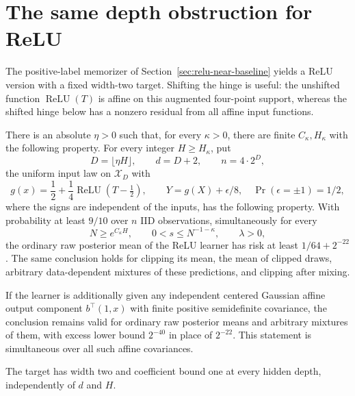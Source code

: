 \section{The same depth obstruction for ReLU}
\label{sec:relu-depth-extension}
The positive-label memorizer of Section~\ref{sec:relu-near-baseline} yields a ReLU version with a fixed width-two target. Shifting the hinge is useful: the unshifted function $\operatorname{ReLU}(T)$ is affine on this augmented four-point support, whereas the shifted hinge below has a nonzero residual from all affine input functions.

\begin{theorem}
\label{thm:relu-depth-lower}
There is an absolute $\eta>0$ such that, for every $\kappa>0$, there are finite $C_\kappa,H_\kappa$ with the following property. For every integer $H\ge H_\kappa$, put
\[
 D=\lfloor\eta H\rfloor,\qquad d=D+2,\qquad n=4\cdot2^D,
\]
the uniform input law on $\mathcal X_D$ with
\[
 g(x)=\frac12+\frac14\operatorname{ReLU}(T-\tfrac12),\qquad
 Y=g(X)+\epsilon/8,\quad \Pr(\epsilon=\pm1)=1/2,
\]
where the signs are independent of the inputs, has the following property. With probability at least $9/10$ over $n$ IID observations, simultaneously for every
\[
 N\ge e^{C_\kappa H},\qquad 0<s\le N^{-1-\kappa},\qquad \lambda>0,
\]
the ordinary raw posterior mean of the ReLU learner has risk at least
$1/64+2^{-22}$. The same conclusion holds for clipping its mean, the mean of clipped draws, arbitrary data-dependent mixtures of these predictions, and clipping after mixing.

If the learner is additionally given any independent centered Gaussian affine output component $b^\top(1,x)$ with finite positive semidefinite covariance, the conclusion remains valid for ordinary raw posterior means and arbitrary mixtures of them, with excess lower bound $2^{-40}$ in place of $2^{-22}$. This statement is simultaneous over all such affine covariances.

The target has width two and coefficient bound one at every hidden depth, independently of $d$ and $H$.
\end{theorem}
